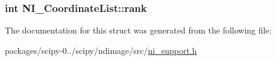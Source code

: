 \subsubsection[{rank}]{\setlength{\rightskip}{0pt plus 5cm}int N\+I\+\_\+\+Coordinate\+List\+::rank}\label{structNI__CoordinateList_a7c118eb34bc25d4aee297037ebf13b94}


The documentation for this struct was generated from the following file\+:\begin{DoxyCompactItemize}
\item 
packages/scipy-\/0../scipy/ndimage/src/\hyperlink{ni__support_8h}{ni\+\_\+support.\+h}\end{DoxyCompactItemize}
